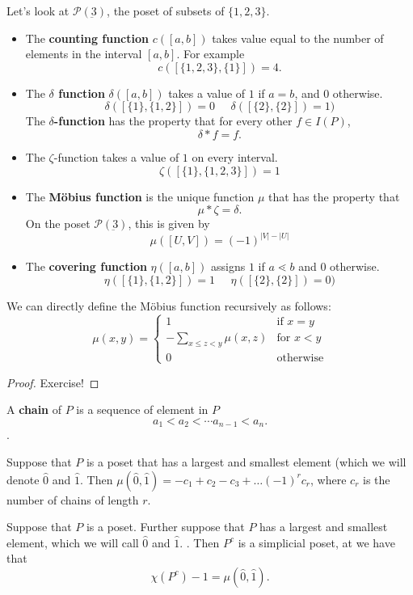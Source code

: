 \begin{example}
	 Let's look at $\mathcal P(\underbar 3)$,  the poset of subsets of $\{1, 2, 3\}$. 
	 \begin{itemize}
	 	\item The \textbf{counting function} $c([a, b])$ takes value equal to the number of elements in the interval $[a, b]$. For example
	 	\[c([\{1, 2, 3\},  \{1\}])=4.\]
	 	\item The \textbf{$\delta$ function} $\delta([a, b])$  takes a value of $1$ if $a=b$,  and $0$ otherwise. 
	 	\[\delta([\{1\},\{1, 2\}])=0\;\;\;\;\; \delta([\{2\}, \{2\}])=1)\]
	 	The \textbf{$\delta$-function} has the property that for every other $f\in I(P)$,  
	 	\[\delta*f=f.\]
	 	\item The $\zeta$-function takes a value of $1$ on every interval.
	 	\[\zeta([\{1\}, \{1, 2, 3\}])=1\]
	 	\item The \textbf{M\"obius function} is the unique function $\mu$ that has the property that 
	 	\[\mu*\zeta=\delta.\]
	 	On the poset $\mathcal P(\underbar 3)$,  this is given by 
	 	\[\mu([U,  V])=(-1)^{|V|-|U|}\]
	 	\item The \textbf{covering function} $\eta([a, b])$ assigns $1$ if $a\lessdot b$ and $0$ otherwise. 
	 	\[\eta([\{1\},\{1, 2\}])=1\;\;\;\;\; \eta([\{2\}, \{2\}])=0)\]
	 \end{itemize}
\end{example}
\begin{lemma}
	We can directly define the M\"obius function recursively as follows:
	\[
		\mu(x, y)=\left\{\begin{array}{cc}
		                 	1 & \text{if $x=y$}\\
		                 	-\sum_{x\leq z < y} \mu(x,  z) & \text{for $x<y$}\\
		                 	0 & \text{otherwise}
		                 \end{array}	\right.\]
\end{lemma}
\begin{proof}
	Exercise!
\end{proof}
\begin{definition}
	A \textbf{chain} of $P$ is a sequence of element in $P$ \[a_1<a_2<\cdots a_{n-1}< a_n.\]. 
\end{definition}

\begin{lemma}
	Suppose that $P$ is a poset that has a largest and smallest element (which we will denote $\hat 0$ and $\hat 1$. Then $\mu(\hat 0,  \hat 1)=-c_1+c_2-c_3+\ldots (-1)^r c_r$,  where $c_r$ is the number of chains of length $r$. 
\end{lemma}



\begin{theorem}
	Suppose that $P$ is a poset. Further suppose that $P$ has a largest and smallest element,  which we will call $\hat 0$ and $\hat 1$. . Then $P^c$ is a simplicial poset,  at we have that 
	\[\chi(P^c)-1=\mu(\hat 0,  \hat 1).\]
\end{theorem}

